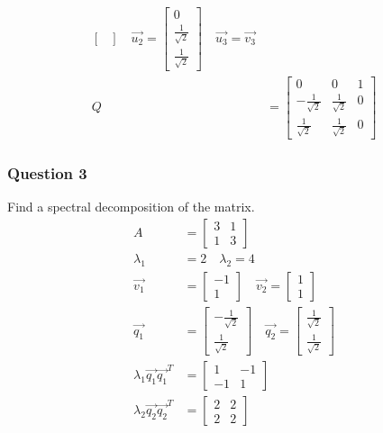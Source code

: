\documentclass{math}
\begin{document}
\begin{align*}
\begin{bmatrix}
  \end{bmatrix} \quad \vec{u_2} = \begin{bmatrix}
    0 \\ \frac{1}{\sqrt{2}} \\ \frac{1}{\sqrt{2}}
  \end{bmatrix} \quad \vec{u_3} = \vec{v_3} \\
  Q &= \begin{bmatrix}
    0 & 0 & 1 \\
    -\frac{1}{\sqrt{2}} & \frac{1}{\sqrt{2}} & 0 \\
    \frac{1}{\sqrt{2}} & \frac{1}{\sqrt{2}} & 0
  \end{bmatrix}
\end{align*}

\subsubsection*{Question 3}
Find a spectral decomposition of the matrix.
\begin{align*}
  A &= \begin{bmatrix}3 & 1 \\ 1 & 3\end{bmatrix} \\
  \lambda_1 &= 2 \quad \lambda_2 = 4 \\
  \vec{v_1} &= \begin{bmatrix}-1 \\ 1\end{bmatrix} \quad
    \vec{v_2} = \begin{bmatrix}1 \\ 1\end{bmatrix} \\
  \vec{q_1} &= \begin{bmatrix}
    -\frac{1}{\sqrt{2}} \\ \frac{1}{\sqrt{2}}
  \end{bmatrix} \quad \vec{q_2} = \begin{bmatrix}
    \frac{1}{\sqrt{2}} \\ \frac{1}{\sqrt{2}}
  \end{bmatrix} \\
  \lambda_1\vec{q_1}\vec{q_1}^T &=
    \begin{bmatrix}1 & -1 \\ -1 & 1\end{bmatrix} \\
  \lambda_2\vec{q_2}\vec{q_2}^T &=
    \begin{bmatrix}2 & 2 \\ 2 & 2\end{bmatrix}
\end{align*}
\end{document}
